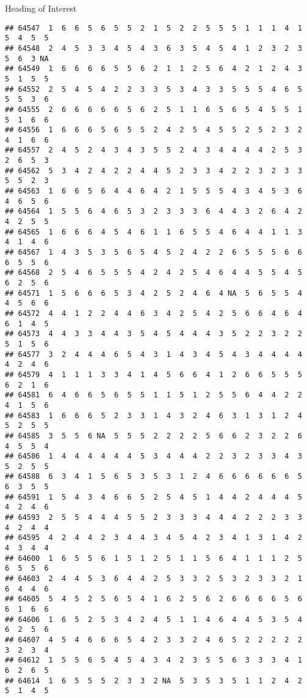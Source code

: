 \documentclass[
  ignorenonframetext,
]{beamer}
\begin{document}
\begin{frame}[fragile]{Heading of Interest}
\begin{verbatim}
## 64547  1  6  6  5  6  5  5  2  1  5  2  2  5  5  5  1  1  1  4  1  5  4  5  5
## 64548  2  4  5  3  3  4  5  4  3  6  3  5  4  5  4  1  2  3  2  3  5  6  3 NA
## 64549  1  6  6  6  6  5  5  6  2  1  1  2  5  6  4  2  1  2  4  3  5  1  5  5
## 64552  2  5  4  5  4  2  2  3  3  5  3  4  3  3  5  5  5  4  6  5  5  5  3  6
## 64555  2  6  6  6  6  6  5  6  2  5  1  1  6  5  6  5  4  5  5  1  5  1  6  6
## 64556  1  6  6  6  5  6  5  5  2  4  2  5  4  5  5  2  5  2  3  2  4  1  6  6
## 64557  2  4  5  2  4  3  4  3  5  5  2  4  3  4  4  4  4  2  5  3  2  6  5  3
## 64562  5  3  4  2  4  2  2  4  4  5  2  3  3  4  2  2  3  2  3  3  5  5  2  3
## 64563  1  6  6  5  6  4  4  6  4  2  1  5  5  5  4  3  4  5  3  6  4  6  5  6
## 64564  1  5  5  6  4  6  5  3  2  3  3  3  6  4  4  3  2  6  4  2  4  2  5  5
## 64565  1  6  6  6  4  5  4  6  1  1  6  5  5  4  6  4  4  1  1  3  4  1  4  6
## 64567  1  4  3  5  3  5  6  5  4  5  2  4  2  2  6  5  5  5  6  6  6  5  5  6
## 64568  2  5  4  6  5  5  5  4  2  4  2  5  4  6  4  4  5  5  4  5  6  2  5  6
## 64571  1  5  6  6  6  5  3  4  2  5  2  4  6  4 NA  5  6  5  5  4  4  5  6  6
## 64572  4  4  1  2  2  4  4  6  3  4  2  5  4  2  5  6  6  4  6  4  6  1  4  5
## 64573  4  4  3  3  4  4  3  5  4  5  4  4  4  3  5  2  2  3  2  2  5  1  5  6
## 64577  3  2  4  4  4  6  5  4  3  1  4  3  4  5  4  3  4  4  4  4  4  2  4  6
## 64579  4  1  1  1  3  3  4  1  4  5  6  6  4  1  2  6  6  5  5  5  6  2  1  6
## 64581  6  4  6  6  5  6  5  5  1  1  5  1  2  5  5  6  4  4  2  2  4  1  5  6
## 64583  1  6  6  6  5  2  3  3  1  4  3  2  4  6  3  1  3  1  2  4  5  2  5  5
## 64585  3  5  5  6 NA  5  5  5  2  2  2  2  5  6  6  2  3  2  2  6  4  5  5  4
## 64586  1  4  4  4  4  4  4  5  3  4  4  4  2  2  3  2  3  3  4  3  5  2  5  5
## 64588  6  3  4  1  5  6  5  3  5  3  1  2  4  6  6  6  6  6  6  5  6  3  5  5
## 64591  1  5  4  3  4  6  6  5  2  5  4  5  1  4  4  2  4  4  4  5  4  2  4  6
## 64593  2  5  5  4  4  4  5  5  2  3  3  3  4  4  4  2  2  2  3  3  4  2  4  4
## 64595  4  2  4  4  2  3  4  4  3  4  5  4  2  3  4  1  3  1  4  2  4  3  4  4
## 64600  1  6  5  5  6  1  5  1  2  5  1  1  5  6  4  1  1  1  2  5  6  5  5  6
## 64603  2  4  4  5  3  6  4  4  2  5  3  3  2  5  3  2  3  3  2  1  6  4  4  6
## 64605  5  4  5  2  5  6  5  4  1  6  2  5  6  2  6  6  6  6  5  6  6  1  6  6
## 64606  1  6  5  2  5  3  4  2  4  5  1  1  4  6  4  4  5  3  5  4  6  2  5  6
## 64607  4  5  4  6  6  6  5  4  2  3  3  2  4  6  5  2  2  2  2  2  3  2  3  4
## 64612  1  5  5  6  5  4  5  4  3  4  2  3  5  5  6  3  3  3  4  1  6  2  6  5
## 64614  1  6  5  5  5  2  3  3  2 NA  5  3  5  3  5  1  1  2  4  2  5  1  4  5

\end{verbatim}
\end{frame}
\end{document}
